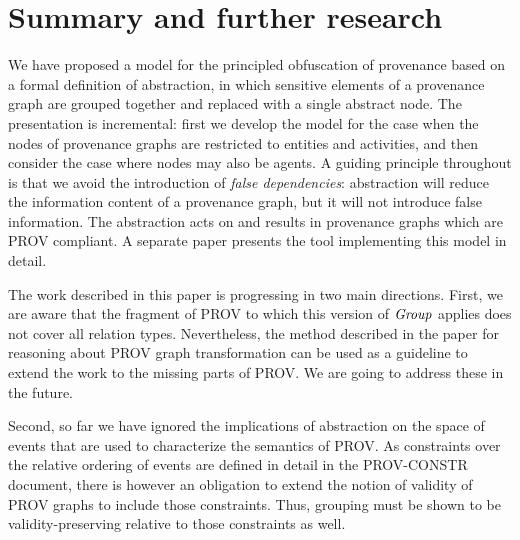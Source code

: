 
\section{Summary and further research}
\label{sec:further}

We have proposed a model for the principled obfuscation of provenance based on a formal definition of abstraction, in which sensitive elements of a provenance graph are grouped together and replaced with a single abstract node.  The presentation is incremental: first we develop the model for the case when the nodes of provenance graphs are restricted to entities and activities, and then consider the case where nodes may also be agents.  A guiding principle  throughout is that we avoid the introduction of \emph{false dependencies}: abstraction will reduce the information content of a provenance graph, but it will not introduce false information.  
The abstraction acts on and results in provenance graphs which are PROV compliant.   A separate paper presents the tool implementing this model in detail.


The work described in this paper is progressing in two main directions.
%
First, we are aware that the fragment of PROV to which this version of $\mathit{Group}$ applies does not cover all relation types. Nevertheless, the method described in the paper for reasoning about PROV graph transformation can be used as a guideline to extend the work to the missing parts of PROV. We are going to address these in the future.

Second, so far we have ignored the implications of abstraction on the space of events that are used to characterize the semantics of PROV. As constraints over the relative ordering of events are defined in detail in the PROV-CONSTR document, there is however an obligation to extend the notion of validity of PROV graphs to include those constraints. Thus, grouping must be shown to be validity-preserving relative to those constraints as well. 


